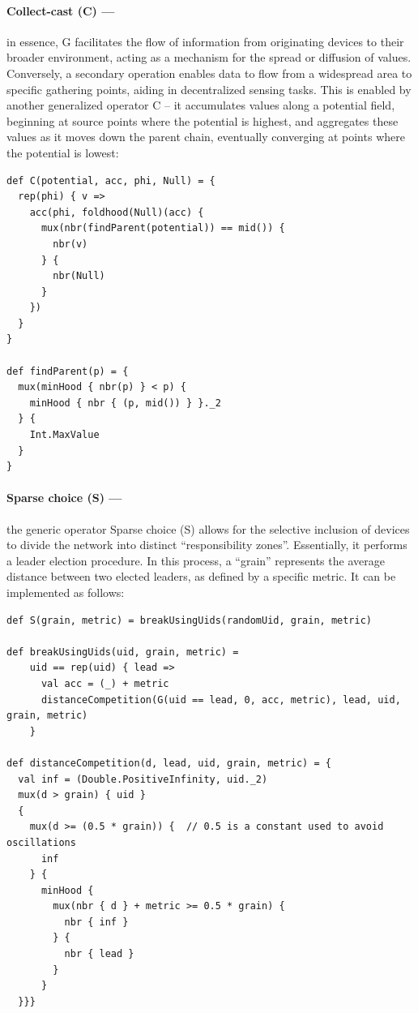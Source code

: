 \paragraph*{Collect-cast (C) --- }
in essence, G facilitates the flow of information from originating devices to their broader environment, 
 acting as a mechanism for the spread or diffusion of values. 
 Conversely, a secondary operation enables data to flow from a widespread area to specific gathering points, 
 aiding in decentralized sensing tasks. 
 This is enabled by another generalized operator C -- 
 it accumulates values along a potential field, beginning at source points where the potential is highest, and aggregates these values as it moves down the parent chain, 
 eventually converging at points where the potential is lowest:
\begin{lstlisting}[language=scafi]
def C(potential, acc, phi, Null) = {
  rep(phi) { v =>
    acc(phi, foldhood(Null)(acc) {
      mux(nbr(findParent(potential)) == mid()) {
        nbr(v)
      } { 
        nbr(Null)
      }
    })
  }
}

def findParent(p) = {
  mux(minHood { nbr(p) } < p) {
    minHood { nbr { (p, mid()) } }._2
  } { 
    Int.MaxValue 
  }
}
\end{lstlisting}
\paragraph*{Sparse choice (S) --- }
the generic operator Sparse choice (S) 
 allows for the selective inclusion of devices to divide the network into distinct ``responsibility zones''. Essentially, it performs a leader election procedure. 
 In this process, a ``grain'' represents the average distance between two elected leaders, as defined by a specific metric. It can be implemented as follows:
\begin{lstlisting}[language=scafi]
def S(grain, metric) = breakUsingUids(randomUid, grain, metric)

def breakUsingUids(uid, grain, metric) =
    uid == rep(uid) { lead =>
      val acc = (_) + metric
      distanceCompetition(G(uid == lead, 0, acc, metric), lead, uid, grain, metric)
    }

def distanceCompetition(d, lead, uid, grain, metric) = {
  val inf = (Double.PositiveInfinity, uid._2)
  mux(d > grain) { uid }
  {
    mux(d >= (0.5 * grain)) {  // 0.5 is a constant used to avoid oscillations
      inf 
    } {
      minHood {
        mux(nbr { d } + metric >= 0.5 * grain) { 
          nbr { inf } 
        } { 
          nbr { lead } 
        }
      }
  }}}
\end{lstlisting}

